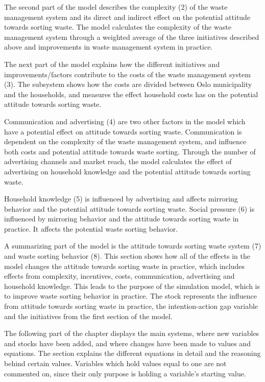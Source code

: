 \indent \newline
The second part of the model describes the complexity (2) of the waste management system and its direct and indirect effect on the potential attitude towards sorting waste. The model calculates the complexity of the waste management system through a weighted average of the three initiatives described above and improvements in waste management system in practice.

\indent \newline
The next part of the model explains how the different initiatives and improvements/factors contribute to the costs of the waste management system (3). The subsystem shows how the costs are divided between Oslo municipality and the households, and measures the effect household costs has on the potential attitude towards sorting waste.

\indent \newline
Communication and advertising (4) are two other factors in the model which have a potential effect on attitude towards sorting waste. Communication is dependent on the complexity of the waste management system, and influence both costs and potential attitude towards waste sorting. Through the number of advertising channels and market reach, the model calculates the effect of advertising on household knowledge and the potential attitude towards sorting waste. 

\indent \newline
Household knowledge (5) is influenced by advertising and affects mirroring behavior and the potential attitude towards sorting waste. Social pressure (6) is influenced by mirroring behavior and the attitude towards sorting waste in practice. It affects the potential waste sorting behavior. 

\indent \newline
A summarizing part of the model is the attitude towards sorting waste system (7) and waste sorting behavior (8). This section shows how all of the effects in the model changes the attitude towards sorting waste in practice, which includes effects from complexity, incentives, costs, communication, advertising and household knowledge. This leads to the purpose of the simulation model, which is to improve waste sorting behavior in practice. The stock represents the influence from attitude towards sorting waste in practice, the intention-action gap variable and the initiatives from the first section of the model.

\indent \newline
The following part of the chapter displays the main systems, where new variables and stocks have been added, and where changes have been made to values and equations. The section explains the different equations in detail and the reasoning behind certain values. Variables which hold values equal to one are not commented on, since their only purpose is holding a variable's starting value.

